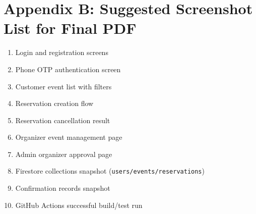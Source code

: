 \documentclass[12pt,a4paper]{article}
\begin{document}
\section*{Appendix B: Suggested Screenshot List for Final PDF}

\begin{enumerate}
    \item Login and registration screens
    \item Phone OTP authentication screen
    \item Customer event list with filters
    \item Reservation creation flow
    \item Reservation cancellation result
    \item Organizer event management page
    \item Admin organizer approval page
    \item Firestore collections snapshot (\texttt{users/events/reservations})
    \item Confirmation records snapshot
    \item GitHub Actions successful build/test run
\end{enumerate}
\end{document}
